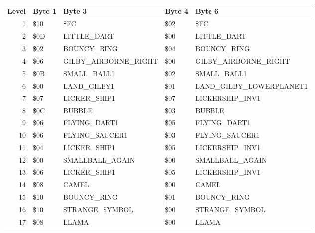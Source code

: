 \begin{figure}[H]
  {
  \setlength{\tabcolsep}{3.0pt}
  \setlength\cmidrulewidth{\heavyrulewidth} %
  \begin{adjustbox}{width=\textwidth}

\begin{tabular}{rllll}
\toprule
   Level & Byte 1    & Byte 3               & Byte 4    & Byte 6                  \\
\midrule
       1 & \$10       & \$FC                  & \$02       & \$FC                     \\
       2 & \$0D       & LITTLE\_DART          & \$00       & LITTLE\_DART             \\
       3 & \$02       & BOUNCY\_RING          & \$04       & BOUNCY\_RING             \\
       4 & \$06       & GILBY\_AIRBORNE\_RIGHT & \$00       & GILBY\_AIRBORNE\_RIGHT    \\
       5 & \$0B       & SMALL\_BALL1          & \$02       & SMALL\_BALL1             \\
       6 & \$00       & LAND\_GILBY1          & \$01       & LAND\_GILBY\_LOWERPLANET1 \\
       7 & \$07       & LICKER\_SHIP1         & \$07       & LICKERSHIP\_INV1         \\
       8 & \$0C       & BUBBLE               & \$03       & BUBBLE                  \\
       9 & \$06       & FLYING\_DART1         & \$05       & FLYING\_DART1            \\
      10 & \$06       & FLYING\_SAUCER1       & \$03       & FLYING\_SAUCER1          \\
      11 & \$04       & LICKER\_SHIP1         & \$05       & LICKERSHIP\_INV1         \\
      12 & \$00       & SMALLBALL\_AGAIN      & \$00       & SMALLBALL\_AGAIN         \\
      13 & \$06       & LICKER\_SHIP1         & \$05       & LICKERSHIP\_INV1         \\
      14 & \$08       & CAMEL                & \$00       & CAMEL                   \\
      15 & \$10       & BOUNCY\_RING          & \$01       & BOUNCY\_RING             \\
      16 & \$10       & STRANGE\_SYMBOL       & \$00       & STRANGE\_SYMBOL          \\
      17 & \$08       & LLAMA                & \$00       & LLAMA                   \\

\end{tabular}
\end{adjustbox}}
\end{figure}
